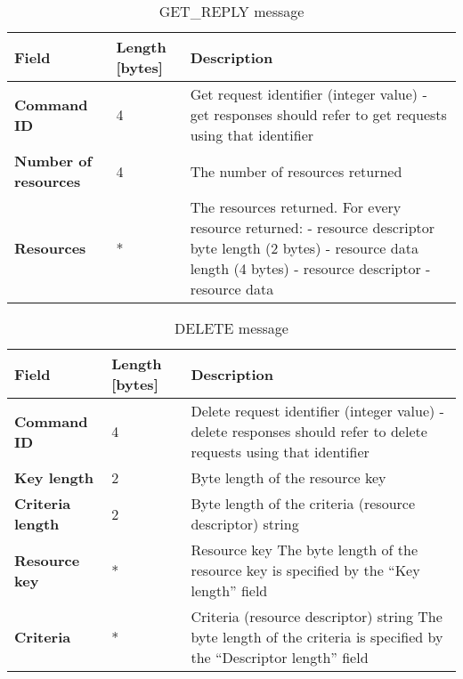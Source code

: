 \begin{table}[H]
\scriptsize
\begin{center}
\begin{tabular}{p{3cm} p{2cm} p{9.5cm}}
	\hline
	\textbf{Field}						& \textbf{Length} [bytes]				& \textbf{Description}				\\[1mm]
    \hline
	\textbf{Command ID}					& 4										& Get request identifier (integer value) - get responses should refer to get requests using that identifier					\\[1.5mm]
	\textbf{Number of resources}		& 4										& The number of resources returned				\\[1.5mm]
	\textbf{Resources}					& *										& The resources returned. For every resource returned: \newline - resource descriptor byte length (2 bytes) \newline - resource data length (4 bytes) \newline - resource descriptor \newline - resource data			\\[1.5mm]
    \hline
\end{tabular}
\end{center}
\caption{GET\_REPLY message}
\label{tab:mGetReply}
\end{table}







\begin{table}[H]
\scriptsize
\begin{center}
\begin{tabular}{p{3cm} p{2cm} p{9.5cm}}
	\hline
	\textbf{Field}						& \textbf{Length} [bytes]				& \textbf{Description}				\\[1mm]
    \hline
    \textbf{Command ID}					& 4										& Delete request identifier (integer value) - delete responses should refer to delete requests using that identifier					\\[1.5mm]
	\textbf{Key length}					& 2										& Byte length of the resource key					\\[1.5mm]
	\textbf{Criteria length}			& 2										& Byte length of the criteria (resource descriptor) string		\\[1.5mm]
	\textbf{Resource key}				& *										& Resource key \newline * The byte length of the resource key is specified by the ``Key length'' field										\\[1.5mm]
	\textbf{Criteria}					& *										& Criteria (resource descriptor) string \newline * The byte length of the criteria is specified by the ``Descriptor length'' field			\\[1.5mm]
    \hline
\end{tabular}
\end{center}
\caption{DELETE message}
\label{tab:mDelete}
\end{table}


